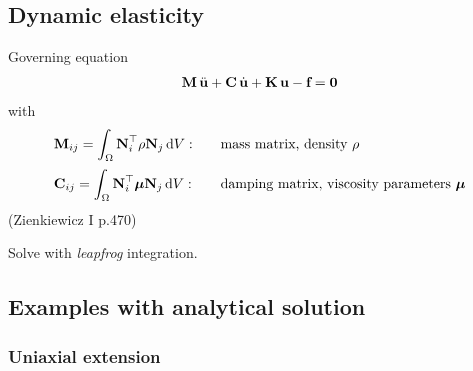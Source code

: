  
\subsection{Dynamic elasticity}

Governing equation
\begin{equation*}
  \begin{array}{lll}
    \textbf{M}\,\ddot{\textbf{u}} + \textbf{C}\,\dot{\textbf{u}} + \textbf{K}\,\textbf{u} - \textbf{f} = \textbf{0}
  \end{array}
\end{equation*}
with
\begin{equation*}
  \begin{array}{lll}
    \bfM_{ij} = \ds\int_{\Omega} \bfN_i^\top \rho \bfN_j \,\d V: \quad &\text{mass matrix, density $\rho$}\\[4mm]
    \bfC_{ij} = \ds\int_{\Omega} \bfN_i^\top \bfmu \bfN_j \,\d V: &\text{damping matrix, viscosity parameters $\bfmu$}
  \end{array}
\end{equation*}
(Zienkiewicz I p.470)

Solve with \emph{leapfrog} integration.

\subsection{Examples with analytical solution}
\subsubsection{Uniaxial extension}


